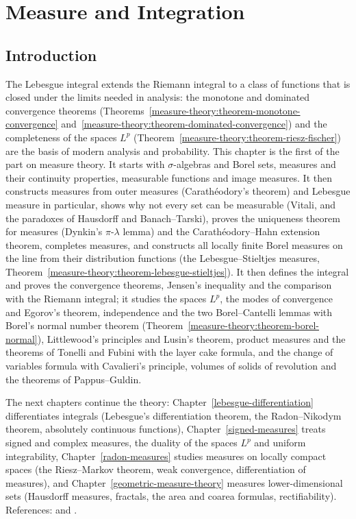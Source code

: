 \chapter{Measure and Integration}\label{measure-theory}

\section{Introduction}\label{measure-theory:section-introduction}

The Lebesgue integral extends the Riemann integral to a class of functions that is closed under the limits needed in analysis: the
monotone and dominated convergence theorems (Theorems~\ref{measure-theory:theorem-monotone-convergence}
and~\ref{measure-theory:theorem-dominated-convergence}) and the completeness of the spaces $L^p$
(Theorem~\ref{measure-theory:theorem-riesz-fischer}) are the basis of modern analysis and probability. This chapter is the first of the part on measure theory. It starts with $\sigma$-algebras and Borel sets, measures and their
continuity properties, measurable functions and image measures. It then constructs measures from outer
measures (Carath\'eodory's theorem) and Lebesgue measure in particular, shows why not every set can be measurable (Vitali, and the paradoxes of Hausdorff and Banach--Tarski), proves the uniqueness
theorem for measures (Dynkin's $\pi$-$\lambda$ lemma) and the Carath\'eodory--Hahn extension theorem, completes measures, and constructs all locally finite Borel measures on the line from their
distribution functions (the Lebesgue--Stieltjes measures, Theorem~\ref{measure-theory:theorem-lebesgue-stieltjes}). It then defines the integral and
proves the convergence theorems, Jensen's inequality and the comparison with the Riemann integral; it studies the spaces $L^p$, the modes of convergence and Egorov's theorem, independence and the two
Borel--Cantelli lemmas with Borel's normal number theorem (Theorem~\ref{measure-theory:theorem-borel-normal}), Littlewood's principles and Lusin's theorem, product measures and the theorems of Tonelli and
Fubini with the layer cake formula, and the change of variables formula with Cavalieri's principle, volumes of solids of revolution and the theorems of Pappus--Guldin.

The next chapters continue the theory: Chapter~\ref{lebesgue-differentiation} differentiates integrals (Lebesgue's differentiation theorem, the Radon--Nikodym theorem, absolutely continuous
functions), Chapter~\ref{signed-measures} treats signed and complex measures, the duality of the spaces $L^p$ and uniform integrability, Chapter~\ref{radon-measures} studies measures on locally compact spaces (the Riesz--Markov theorem, weak convergence, differentiation of measures), and
Chapter~\ref{geometric-measure-theory} measures lower-dimensional sets (Hausdorff measures, fractals, the area and coarea formulas, rectifiability).
References: \cite{rudin-rca} and \cite{folland-real}.

